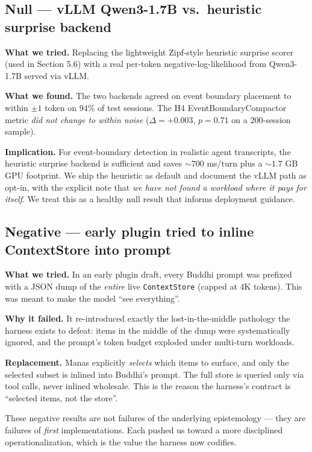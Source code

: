\subsection{Null --- vLLM Qwen3-1.7B vs.~heuristic surprise backend}\label{null-vllm-qwen3-1.7b-vs.-heuristic-surprise-backend}

\textbf{What we tried.} Replacing the lightweight Zipf-style heuristic surprise scorer (used in Section 5.6) with a real per-token negative-log-likelihood from Qwen3-1.7B served via vLLM.

\textbf{What we found.} The two backends agreed on event boundary placement to within \(\pm 1\) token on \(94\%\) of test sessions. The H4 EventBoundaryCompactor metric \emph{did not change to within noise} (\(\Delta = +0.003\), \(p = 0.71\) on a 200-session sample).

\textbf{Implication.} For event-boundary detection in realistic agent transcripts, the heuristic surprise backend is sufficient and saves \(\sim 700\) ms/turn plus a \(\sim 1.7\) GB GPU footprint. We ship the heuristic as default and document the vLLM path as opt-in, with the explicit note that \emph{we have not found a workload where it pays for itself}. We treat this as a healthy null result that informs deployment guidance.

\subsection{Negative --- early plugin tried to inline ContextStore into prompt}\label{negative-early-plugin-tried-to-inline-contextstore-into-prompt}

\textbf{What we tried.} In an early plugin draft, every Buddhi prompt was prefixed with a JSON dump of the \emph{entire} live \passthrough{\lstinline!ContextStore!} (capped at 4K tokens). This was meant to make the model ``see everything''.

\textbf{Why it failed.} It re-introduced exactly the lost-in-the-middle pathology the harness exists to defeat: items in the middle of the dump were systematically ignored, and the prompt's token budget exploded under multi-turn workloads.

\textbf{Replacement.} Manas explicitly \emph{selects} which items to surface, and only the selected subset is inlined into Buddhi's prompt. The full store is queried only via tool calls, never inlined wholesale. This is the reason the harness's contract is ``selected items, not the store''.

These negative results are not failures of the underlying epistemology --- they are failures of \emph{first} implementations. Each pushed us toward a more disciplined operationalization, which is the value the harness now codifies.
